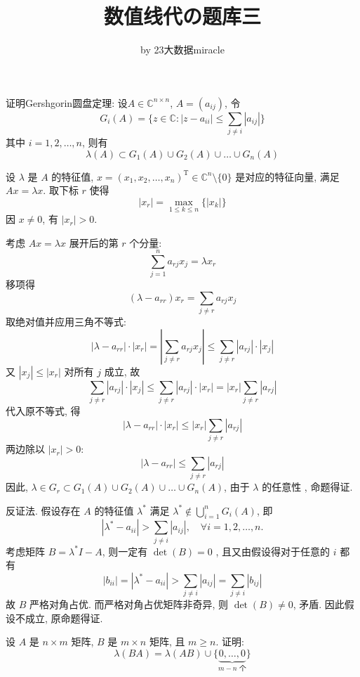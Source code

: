 \documentclass[12pt, answers]{exam}     %
\title{数值线代の题库三}
\author{by 23大数据miracle}
\date{}
\newcommand{\C}{\mathbb{C}}
\newcommand{\T}{\mathrm{T}}
\begin{document}
\maketitle

\begin{questions}

\question{} 证明Gershgorin圆盘定理: 
设$ A \in \C^{n \times n} $, $ A = (a_{ij}) $, 令
\[
G_i(A) = \{ z \in \C : |z - a_{ii}| \leq \sum_{j \neq i} |a_{ij}| \}
\]
其中 $i = 1, 2, \ldots, n $, 则有
\[ \lambda(A) \subset G_1(A) \cup G_2(A) \cup \ldots \cup G_n(A)
\]

\begin{solution}
设 \(\lambda\) 是 \(A\) 的特征值, \(x = (x_1, x_2, \dots, x_n)^{\T} \in \C^n \setminus \{ 0 \}\) 是对应的特征向量, 满足 \(A x = \lambda x\). 
取下标 \(r\) 使得
\[
|x_r| = \max_{1 \leq k \leq n} \{ |x_k| \}
\]
因 \(x \neq 0 \), 有 \(|x_r| > 0 \). 

考虑 \(A x = \lambda x\) 展开后的第 \(r\) 个分量: 
\[
\sum_{j=1}^n a_{rj} x_j = \lambda x_r
\]
移项得
\[
(\lambda - a_{rr}) x_r = \sum_{j \neq r} a_{rj} x_j
\]
取绝对值并应用三角不等式: 
\[
|\lambda - a_{rr}| \cdot |x_r| = \left| \sum_{j \neq r} a_{rj} x_j \right| \leq \sum_{j \neq r} |a_{rj}| \cdot |x_j|
\]
又 \(|x_j| \leq |x_r|\) 对所有 \(j\) 成立, 故
\[
\sum_{j \neq r} |a_{rj}| \cdot |x_j| \leq \sum_{j \neq r} |a_{rj}| \cdot |x_r| = |x_r| \sum_{j \neq r} |a_{rj}|
\]
代入原不等式, 得
\[
|\lambda - a_{rr}| \cdot |x_r| \leq |x_r| \sum_{j \neq r} |a_{rj}|
\]
两边除以 \(|x_r| > 0 \): 
\[
|\lambda - a_{rr}| \leq \sum_{j \neq r} |a_{rj}|
\]
因此, \(\lambda \in G_r \subset G_1(A) \cup G_2(A) \cup \ldots \cup G_n(A) \), 由于 \( \lambda \) 的任意性 , 命题得证. 

\begin{anothersolution}
反证法. 假设存在 $ A $ 的特征值 $\lambda^*$ 满足 $\lambda^* \notin \bigcup_{i=1}^n G_i(A)$, 即
\[
|\lambda^* - a_{ii}| > \sum_{j \neq i} |a_{ij}|, \quad \forall i = 1, 2, \ldots, n. 
\]
考虑矩阵 $B = \lambda^* I - A$, 则一定有 $ \det(B) = 0 $ , 且又由假设得对于任意的 $ i $ 都有
\[
|b_{ii}| = |\lambda^* - a_{ii}| > \sum_{j \neq i} |a_{ij}| = \sum_{j \neq i} |b_{ij}|
\]
故 $ B $ 严格对角占优. 而严格对角占优矩阵非奇异, 则 $ \det(B) \ne 0 $, 矛盾. 因此假设不成立, 原命题得证.
\end{anothersolution}

\end{solution}

\question{}设 \( A \) 是 \( n \times m \) 矩阵, \( B \) 是 \( m \times n \) 矩阵, 且 \( m \geq n \). 证明: 
\[
\lambda(BA) = \lambda(AB) \cup \{\underbrace{0, \ldots, 0}_{\text{$m-n$ 个}}\}
\]


\end{questions}
\end{document}
